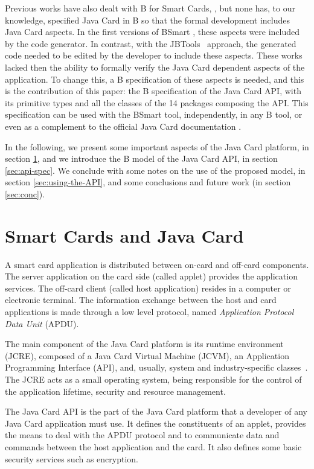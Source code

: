 \documentclass{llncs}
\begin{document}
Previous works have also dealt with B for Smart Cards,
\cite{Bert:2003,JBtools,tatibouet:lncs,requetBtoC}, but none has, to
our knowledge, specified Java Card in B so that the formal development
includes Java Card aspects. In the first versions of BSmart
\cite{Gomes10}, these aspects were included by the code generator. In 
contrast, with the JBTools~\cite{JBtools} approach, the generated code needed to be edited by
the developer to include these aspects. These works lacked then the ability to formally verify the Java Card
dependent aspects of the application. To change this, a B
specification of these aspects is needed, and this is the contribution
of this paper: the B specification of the Java Card API, with its
primitive types and all the classes of the 14 packages composing the
API. This specification can be used with the BSmart tool, 
independently, in any B tool, or even as a complement to the official
Java Card documentation \cite{oracle}.

In the following, we present some important aspects of the Java Card platform, in section \ref{sec:javacard}, and we introduce the B model of the Java Card API,  in section \ref{sec:api-spec}. We conclude with some notes on the use of the proposed model, in section \ref{sec:using-the-API}, and some conclusions and future work (in section \ref{sec:conc}).


\section{Smart Cards and Java Card}\label{sec:javacard}

A smart card application is distributed between on-card and off-card
components.  The server application on the card side (called applet)
provides the application services. The off-card client (called host
application) resides in a computer or electronic terminal. The information 
exchange between the host and card applications is
made through a  low level protocol, named
\emph{Application Protocol Data Unit} (APDU).  

The main component of the Java Card platform
is its runtime environment (JCRE), composed of a Java Card Virtual
Machine (JCVM), an Application Programming Interface (API), and, usually, system and
industry-specific classes~\cite{chen:2000}. The JCRE acts as a small
operating system, being responsible for the control of the application
lifetime, security and resource management.

The Java Card API is the part of the Java Card platform that a developer of any Java Card application must use. It defines the constituents of an applet, provides the means to deal with the APDU protocol and to communicate data and commands between the host application and the card. It also defines some basic security services such as encryption.
\end{document}
